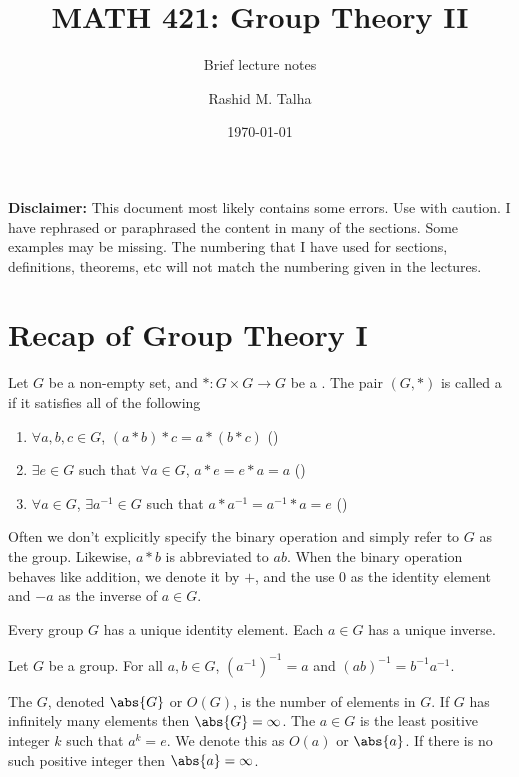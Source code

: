 \documentclass[11pt]{penrose}
\title{MATH 421: Group Theory II}
\subtitle{Brief lecture notes}
\author{Rashid M. Talha}
\affiliation{School of Natural Sciences, NUST}
\date{\today}
\begin{document}
\maketitle

\textbf{Disclaimer:} This document most likely contains some errors. Use with caution. I have rephrased or paraphrased the content in many of the sections. Some examples may be missing. The numbering that I have used for sections, definitions, theorems, etc will not match the numbering given in the lectures.

\section{Recap of Group Theory I}
\begin{ndfn}[Group]
    Let $G$ be a non-empty set, and $* : G \times G \to G$ be a . The pair $(G, *)$ is called a  if it satisfies all of the following
    \begin{enumerate}
        \item $\forall a, b, c \in G$, $(a * b) * c = a * (b * c)$ \hfill()
        \item $\exists e \in G$ such that $\forall a \in G$, $a * e = e * a = a$ \hfill()
        \item $\forall a \in G$, $\exists a^{-1} \in G$ such that $a * a^{-1} = a^{-1} * a = e$ \hfill()
    \end{enumerate}
\end{ndfn}

Often we don't explicitly specify the binary operation and simply refer to $G$ as the group. Likewise, $a * b$ is abbreviated to $ab$. When the binary operation behaves like addition, we denote it by $+$, and the use $0$ as the identity element and $-a$ as the inverse of $a \in G$.

\begin{nthm}
    Every group $G$ has a unique identity element. Each $a \in G$ has a unique inverse.
\end{nthm}

\begin{nthm}
    Let $G$ be a group. For all $a, b \in G$, $(a^{-1})^{-1} = a$ and $(ab)^{-1} = b^{-1} a^{-1}$.
\end{nthm}

\begin{ndfn}
    The  $G$, denoted $\abs{G}$ or $O(G)$, is the number of elements in $G$. If $G$ has infinitely many elements then $\abs{G} = \infty$. The  $a \in G$ is the least positive integer $k$ such that $a^k = e$. We denote this as $O(a)$ or $\abs{a}$. If there is no such positive integer then $\abs{a} = \infty$.
\end{ndfn}
\end{document}
